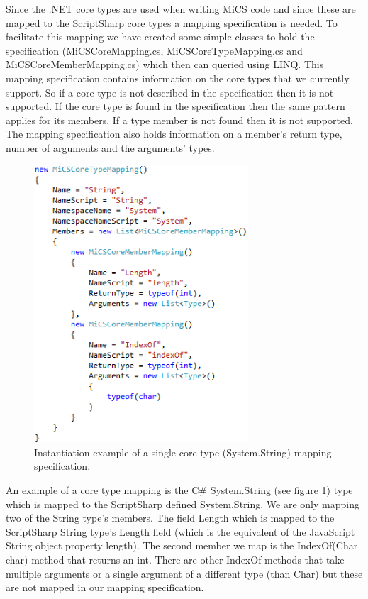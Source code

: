 		Since the .NET core types are used when writing MiCS code and since these are mapped to the ScriptSharp core types a mapping specification is needed. To facilitate this mapping we have created some simple classes to hold the specification (MiCSCoreMapping.cs, MiCSCoreTypeMapping.cs and MiCSCoreMemberMapping.cs) which then can queried using LINQ. This mapping specification contains information on the core types that we currently support. So if a core type is not described in the specification then it is not supported. If the core type is found in the specification then the same pattern applies for its members. If a type member is not found then it is not supported. The mapping specification also holds information on a member’s return type, number of arguments and the arguments’ types.

		\begin{figure}[H]
				\includegraphics[width=8cm]{resources/images/InitiationOfTypeMapping.png}
			\caption{Instantiation example of a single core type (System.String) mapping specification.}
			\label{coreTypeMapping}
		\end{figure}

		An example of a core type mapping is the C\# System.String (see figure \ref{coreTypeMapping}) type which is mapped to the ScriptSharp defined System.String. We are only mapping two of the String type’s members. The field Length which is mapped to the ScriptSharp String type’s Length field (which is the equivalent of the JavaScript String object property length). The second member we map is the IndexOf(Char char) method that returns an int. There are other IndexOf methods that take multiple arguments or a single argument of a different type (than Char) but these are not mapped in our mapping specification.

